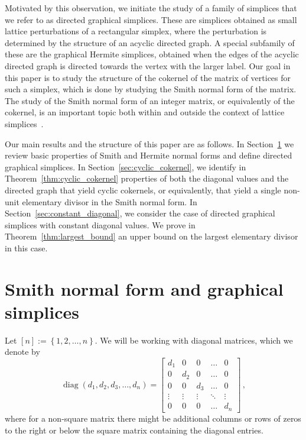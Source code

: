 \documentclass[12pt]{amsart}
\theoremstyle{definition}
\numberwithin{equation}{section}
\renewcommand\>{\rangle}
\newcommand\<{\langle}
\newcommand\0{\mathbf{0}}
\newcommand\set[1]{\left\{#1\right\}}
\DeclareMathOperator{\diag}{diag}
\begin{document}
Motivated by this observation, we initiate the study of a family of simplices that we refer to as directed graphical simplices. 
These are simplices obtained as small lattice perturbations of a rectangular simplex, where the perturbation is determined by the structure of an acyclic directed graph.
A special subfamily of these are the graphical Hermite simplices, obtained when the edges of the acyclic directed graph is directed towards the vertex with the larger label.
Our goal in this paper is to study the structure of the cokernel of the matrix of vertices for such a simplex, which is done by studying the Smith normal form of the matrix.
The study of the Smith normal form of an integer matrix, or equivalently of the cokernel, is an important topic both within and outside the context of lattice simplices~\cite{distinguishinggraphsnf,criticalstarscomplete,oaxacaarithstructures,criticalsignedgraphs,criticalstarclique,2025picardjacobian,snfdifferential,stanleysnfcomb,wangstanley}.

Our main results and the structure of this paper are as follows.
In Section~\ref{sec:snf} we review basic properties of Smith and Hermite normal forms and define directed graphical simplices.
In Section~\ref{sec:cyclic_cokernel}, we identify in Theorem~\ref{thm:cyclic_cokernel} properties of both the diagonal values and the directed graph that yield cyclic cokernels, or equivalently, that yield a single non-unit elementary divisor in the Smith normal form.
In Section~\ref{sec:constant_diagonal}, we consider the case of directed graphical simplices with constant diagonal values.
We prove in Theorem~\ref{thm:largest_bound} an upper bound on the largest elementary divisor in this case.


\section{Smith normal form and graphical simplices}
\label{sec:snf}

Let $[n] := \set{1,2,\dots,n}$. We will be working with diagonal matrices, which we denote by
\[
\diag(d_1,d_2,d_3,\dots, d_n) = \begin{bmatrix}
	d_1 & 0 & 0 & \dots & 0 \\
	0 & d_2 & 0 & \dots & 0 \\
	0 & 0 &  d_3 & \dots & 0 \\
	\vdots & \vdots & \vdots & \ddots & \vdots \\
	0 & 0 & 0 & \dots & d_n
\end{bmatrix} \, ,
\]
where for a non-square matrix there might be additional columns or rows of zeros to the right or below the square matrix containing the diagonal entries.
\end{document}
